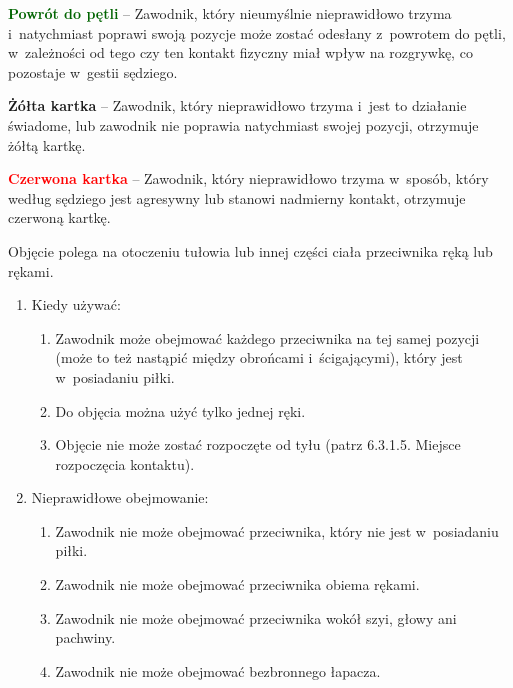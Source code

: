 \documentclass[12pt,a4paper]{article}
\renewcommand{\paragraph}[1]{
  \oldparagraph{#1}%
  \leftskip2cm
}
\newcommand\redcard[1]{\bgroup\textcolor{red}{\textbf{#1}}}
\newcommand\yellowcard[1]{\bgroup\textcolor{darkyellow}{\textbf{#1}}}
\newcommand\other[1]{\bgroup\textcolor{darkgreen}{\textbf{#1}}}
\begin{document}
\other{Powrót do pętli} -- Zawodnik, który nieumyślnie nieprawidłowo
trzyma i~natychmiast poprawi swoją pozycje może zostać odesłany z~powrotem do pętli, w~zależności od tego czy ten kontakt fizyczny miał
wpływ na rozgrywkę, co pozostaje w~gestii sędziego.

\yellowcard{Żółta kartka} -- Zawodnik, który nieprawidłowo trzyma i~jest to
działanie świadome, lub zawodnik nie poprawia natychmiast swojej
pozycji, otrzymuje żółtą kartkę.

\redcard{Czerwona kartka} -- Zawodnik, który nieprawidłowo trzyma w~sposób,
który według sędziego jest agresywny lub stanowi nadmierny kontakt,
otrzymuje czerwoną kartkę.

\paragraph{Obejmowanie}
Objęcie polega na otoczeniu tułowia lub
innej części ciała przeciwnika ręką lub rękami.

\begin{enumerate}
	\item
	      Kiedy używać:

	      \begin{enumerate}
		      \item
		            Zawodnik może obejmować każdego przeciwnika na tej samej pozycji
		            (może to też nastąpić między obrońcami i~ścigającymi), który jest w~posiadaniu piłki.
		      \item
		            Do objęcia można użyć tylko jednej ręki.
		      \item
		            Objęcie nie może zostać rozpoczęte od tyłu (patrz 6.3.1.5. Miejsce
		            rozpoczęcia kontaktu).
	      \end{enumerate}
	\item
	      Nieprawidłowe obejmowanie:

	      \begin{enumerate}
		      \item Zawodnik nie może obejmować przeciwnika, który nie jest w~posiadaniu
		            piłki.
		      \item
		            Zawodnik nie może obejmować przeciwnika obiema rękami.
		      \item
		            Zawodnik nie może obejmować przeciwnika wokół szyi, głowy ani
		            pachwiny.
		      \item
		            Zawodnik nie może obejmować bezbronnego łapacza.
	      \end{enumerate}
\end{enumerate}
\end{document}
